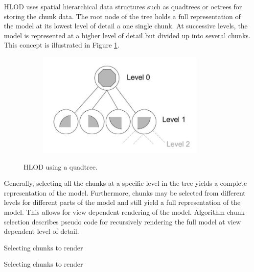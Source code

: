 HLOD uses spatial hierarchical data structures such as quadtrees or octrees for storing the chunk data. The root node of the tree holds a full representation of the model at its lowest level of detail a one single chunk. At successive levels, the model is represented at a higher level of detail but divided up into several chunks. This concept is illustrated in Figure \ref{fig:hlod}.

\begin{figure}[htbp]
    \centering
    \begin{subfigure}[bt]{0.4\textwidth}
        \includegraphics[width=\textwidth]{figures/lod/hlod_tmp.png}
    \end{subfigure}
    \caption{HLOD using a quadtree.}
    \label{fig:hlod}
\end{figure}

Generally, selecting all the chunks at a specific level in the tree yields a complete representation of the model. Furthermore, chunks may be selected from different levels for different parts of the model and still yield a full representation of the model. This allows for view dependent rendering of the model. Algorithm chunk selection describes pseudo code for recursively rendering the full model at view dependent level of detail.

\begin{algorithm}[htp]
  \caption{Selecting chunks to render}
    \label{alg:chunkselection}
  \caption{Selecting chunks to render}
\end{algorithm} 

